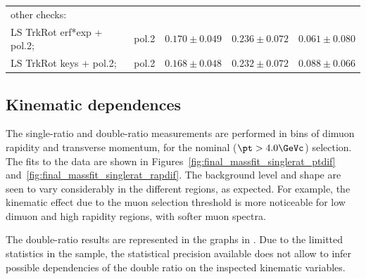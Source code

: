 \begin{table}[!h]
\begin{tabular}{ll|c|c|c}
\hline \hline
\multicolumn{4}{l}{other checks:} \\
LS TrkRot erf*exp + pol.2; & pol.2 & $0.170\pm0.049$ & $0.236\pm0.072$   & $0.061 \pm 0.080$\\
LS TrkRot keys + pol.2;    & pol.2 & $0.168\pm0.048$ & $0.232\pm0.072$   & $0.088 \pm 0.066$\\
\hline
\end{tabular}
  \label{tab:final-doublerat-syst}
\end{table}

%


\subsection{Kinematic dependences}

The single-ratio and double-ratio measurements are performed in bins of dimuon rapidity and transverse momentum, %
for the nominal ($\pt>4.0 \GeVc$) selection. 
The fits to the data are shown in Figures~\ref{fig:final_massfit_singlerat_ptdif} and~\ref{fig:final_massfit_singlerat_rapdif}.
The background level and shape are seen to vary considerably in the different regions, as expected. 
For example, the kinematic effect due to the muon \pt{} selection threshold is more noticeable for low dimuon \pt{} and high rapidity regions, with softer muon \pt{} spectra. 

The double-ratio results are represented in the graphs in . 
Due to the limitted statistics in the \pp sample, the statistical precision available does not allow to infer possible dependencies of the double ratio on the inspected kinematic variables. 

